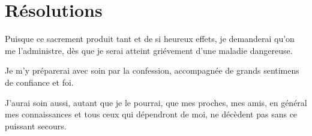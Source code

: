 \documentclass[instructions.tex]{subfiles}
\begin{document}
\section{Résolutions}

\primo Puisque ce sacrement produit tant et de si heureux effets, je demanderai qu'on me l'administre, dès que je serai atteint griévement d'une maladie dangereuse. 

\secundo Je m'y préparerai avec soin par la confession, accompagnée de grands sentimens de confiance et foi. 

\tertio J'aurai soin aussi, autant que je le pourrai, que mes proches, mes amis, en général mes connaissances et tous ceux qui dépendront de moi, ne décèdent pas sans ce puissant secours. 
 
\end{document}
